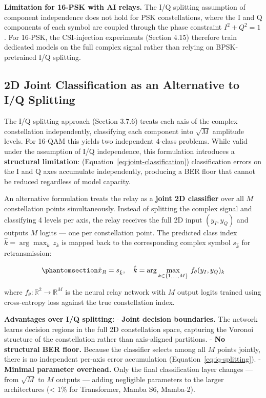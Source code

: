 \textbf{Limitation for 16-PSK with AI relays.} The I/Q splitting assumption of component independence does not hold for PSK constellations, where the I and Q components of each symbol are coupled through the phase constraint \(I^2 + Q^2 = 1\). For 16-PSK, the CSI-injection experiments (Section 4.15) therefore train dedicated models on the full complex signal rather than relying on BPSK-pretrained I/Q splitting.

\subsection{2D Joint Classification as an Alternative to I/Q Splitting}\label{sec:d-joint-classification-as-an-alternative-to-iq-splitting}

The I/Q splitting approach (Section 3.7.6) treats each axis of the complex constellation independently, classifying each component into \(\sqrt{M}\) amplitude levels. For 16-QAM this yields two independent 4-class problems. While valid under the assumption of I/Q independence, this formulation introduces a \textbf{structural limitation}: (Equation~\ref{eq:joint-classification}) classification errors on the I and Q axes accumulate independently, producing a BER floor that cannot be reduced regardless of model capacity.

An alternative formulation treats the relay as a \textbf{joint 2D classifier} over all \(M\) constellation points simultaneously. Instead of splitting the complex signal and classifying 4 levels per axis, the relay receives the full 2D input \((y_I, y_Q)\) and outputs \(M\) logits --- one per constellation point. The predicted class index \(\hat{k} = \arg\max_k \, z_k\) is mapped back to the corresponding complex symbol \(s_{\hat{k}}\) for retransmission:

\begin{equation}\protect\phantomsection\label{eq:joint-classification}{\hat{x}_R = s_{\hat{k}}, \quad \hat{k} = \arg\max_{k \in \{1, \dots, M\}} \, f_\theta(y_I, y_Q)_k
}\end{equation}

where \(f_\theta : \mathbb{R}^2 \to \mathbb{R}^M\) is the neural relay network with \(M\) output logits trained using cross-entropy loss against the true constellation index.

\textbf{Advantages over I/Q splitting:} - \textbf{Joint decision boundaries.} The network learns decision regions in the full 2D constellation space, capturing the Voronoi structure of the constellation rather than axis-aligned partitions. - \textbf{No structural BER floor.} Because the classifier selects among all \(M\) points jointly, there is no independent per-axis error accumulation (Equation~\ref{eq:iq-splitting}). - \textbf{Minimal parameter overhead.} Only the final classification layer changes --- from \(\sqrt{M}\) to \(M\) outputs --- adding negligible parameters to the larger architectures (\textless{} 1\% for Transformer, Mamba S6, Mamba-2).

